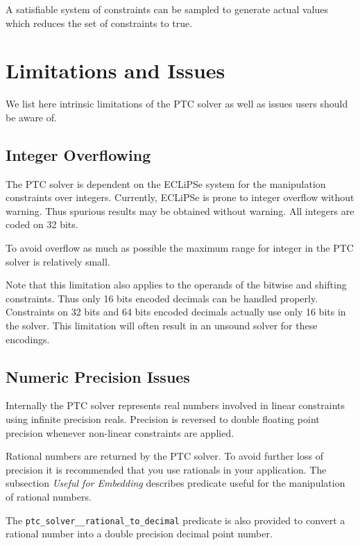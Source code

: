 \documentclass{article}
\begin{document}
A satisfiable system of constraints can be sampled to generate actual values
which reduces the set of constraints to true.

\section{Limitations and Issues}
We list here intrinsic limitations of the PTC solver as well as issues users
should be aware of.

\subsection{Integer Overflowing}

The PTC solver is dependent on the ECLiPSe system for the manipulation
constraints over integers. Currently, ECLiPSe is
prone to integer overflow without warning. Thus spurious results may be obtained
without warning.
All integers are coded on 32 bits.

To avoid overflow as much as possible the maximum range for integer in the PTC
solver is relatively small.

Note that this limitation also applies to the operands of the bitwise and
shifting constraints. Thus only 16 bits encoded decimals can be
handled properly. Constraints on 32 bits and 64 bits encoded decimals actually
use only 16 bits in the solver. This limitation will often
result in an unsound solver for these encodings.

\subsection{Numeric Precision Issues}

Internally the PTC solver represents real numbers involved in linear constraints
using infinite precision reals. Precision is reversed to
double floating point precision whenever non-linear constraints are applied.

Rational numbers are returned by the PTC solver. To avoid further loss of
precision it is recommended that you use rationals in your application.
The subsection \textit{Useful for Embedding} describes predicate useful for the
manipulation of rational numbers.

The \texttt{ptc\_solver\_\_rational\_to\_decimal} predicate is also provided to convert a
rational number into a double precision decimal point
number.
\end{document}
